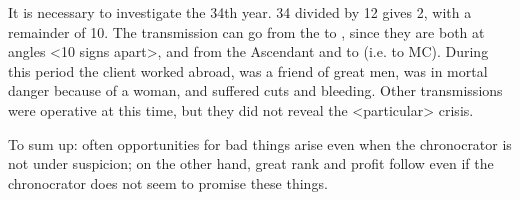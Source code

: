 It is necessary to investigate the 34th year. 34 divided by 12 gives 2, with a remainder of 10. The transmission can go from the \Moon\xspace to \Mars, since they are both at angles <10 signs apart>, and from the Ascendant and \Mars\xspace to \Taurus\xspace (i.e. to MC). During this period the client worked abroad, was a friend of great men, was in mortal danger because of a woman, and suffered cuts and bleeding. Other transmissions were operative at this time, but they did not reveal the <particular> crisis.

To sum up: often opportunities for bad things arise even when the chronocrator is not under suspicion; on the other hand, great rank and profit follow even if the chronocrator does not seem to promise these
things.


\newpage